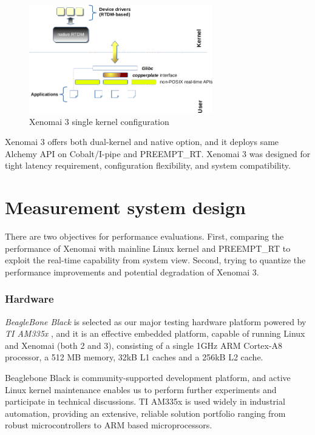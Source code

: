 \documentclass[10pt,a4paper]{article}
\begin{document}
\begin{multicols}{2}
\begin{figure}[H]
\begin{center}
\includegraphics[width=8cm]{img/x3-mercury.png}
\caption{Xenomai 3 single kernel configuration}
\label{xenomai3-coblat}
\end{center}
\end{figure}

Xenomai 3 offers both dual-kernel and native option, and it deploys same Alchemy \cite{x3-applications} API on Cobalt/I-pipe and PREEMPT\_RT. Xenomai 3 was designed for tight latency requirement, configuration flexibility, and system compatibility.

\section{Measurement system design}
There are two objectives for performance evaluations. First, comparing the performance of Xenomai with mainline Linux kernel and PREEMPT\_RT to exploit the real-time capability from system view. Second, trying to quantize the performance improvements and potential degradation of Xenomai 3.

\subsubsection{Hardware}
\textit{BeagleBone Black}\cite{bbb} is selected as our major testing hardware platform powered by \textit{TI AM335x} \cite{am335x}, and it is an effective embedded platform, capable of running Linux and Xenomai (both 2 and 3), consisting of a single 1GHz ARM Cortex-A8 processor, a 512 MB memory, 32kB L1 caches and a 256kB L2 cache.

Beaglebone Black is community-supported development platform, and active Linux kernel maintenance enables us to perform further experiments and participate in technical discussions. TI AM335x is used widely in industrial automation, providing an extensive, reliable solution portfolio ranging from robust microcontrollers to ARM based microprocessors.


\end{multicols}
\end{document}
